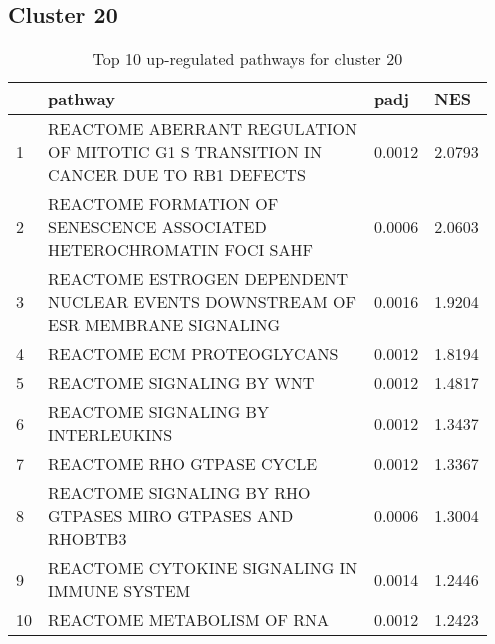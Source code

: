 \documentclass{article}
\begin{document}
\subsection{Cluster 20 }
\begin{table}[H]
\centering
\begin{tabular}{p{0.05\linewidth}p{0.7\linewidth}p{0.1\linewidth}p{0.1\linewidth}}
  \hline
 & pathway & padj & NES \\ 
  \hline
1 & REACTOME ABERRANT REGULATION OF MITOTIC G1 S TRANSITION IN CANCER DUE TO RB1 DEFECTS & 0.0012 & 2.0793 \\ 
  2 & REACTOME FORMATION OF SENESCENCE ASSOCIATED HETEROCHROMATIN FOCI SAHF & 0.0006 & 2.0603 \\ 
  3 & REACTOME ESTROGEN DEPENDENT NUCLEAR EVENTS DOWNSTREAM OF ESR MEMBRANE SIGNALING & 0.0016 & 1.9204 \\ 
  4 & REACTOME ECM PROTEOGLYCANS & 0.0012 & 1.8194 \\ 
  5 & REACTOME SIGNALING BY WNT & 0.0012 & 1.4817 \\ 
  6 & REACTOME SIGNALING BY INTERLEUKINS & 0.0012 & 1.3437 \\ 
  7 & REACTOME RHO GTPASE CYCLE & 0.0012 & 1.3367 \\ 
  8 & REACTOME SIGNALING BY RHO GTPASES MIRO GTPASES AND RHOBTB3 & 0.0006 & 1.3004 \\ 
  9 & REACTOME CYTOKINE SIGNALING IN IMMUNE SYSTEM & 0.0014 & 1.2446 \\ 
  10 & REACTOME METABOLISM OF RNA & 0.0012 & 1.2423 \\ 
   \hline
\end{tabular}
\caption{Top 10 up-regulated pathways for cluster 20} 
\label{tab:q3_2_20}
\end{table}
\end{document}
